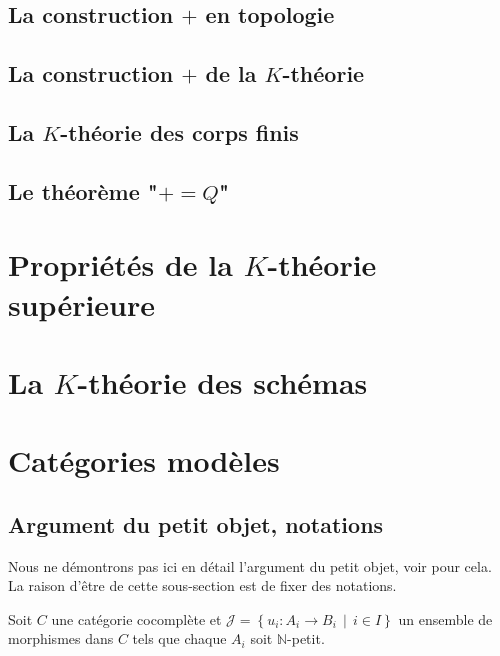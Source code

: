 \documentclass{amsart}
\theoremstyle{plain}
\theoremstyle{definition}
\theoremstyle{remark}
\newcommand{\ensemblenombre }[1]{\mathbb{#1}}
\newcommand{\N}{\ensemblenombre{N}}
\newcommand{\ra}{\rightarrow}
\newcommand{\enstq}[2]{\left\{#1\,\middle|\,#2\right\}}
\begin{document}
\subsection{\texorpdfstring{La construction $+$ en topologie}{La construction + en topologie}}

\subsection{\texorpdfstring{La construction $+$ de la $K$-théorie}{La construction + de la K-théorie}}

\subsection{\texorpdfstring{La $K$-théorie des corps finis}{La K-théorie des corps finis}}

\subsection{\texorpdfstring{Le théorème "$+=Q$"}{Le théorème "+=Q"}}

\section{\texorpdfstring{Propriétés de la $K$-théorie supérieure}{Propriétés de la K-théorie supérieure}}

\section{\texorpdfstring{La $K$-théorie des schémas}{La K-théorie des schémas}}

\appendix

\section{Catégories modèles}

\subsection{Argument du petit objet, notations}

Nous ne démontrons pas ici en détail l'argument du petit objet, voir \cite[Chp.1]{Goer} pour cela.
La raison d'être de cette sous-section est de fixer des notations.

Soit $C$ une catégorie cocomplète et $\mathcal{J}=\enstq{u_i:A_i\ra B_i}{i\in I}$ un ensemble de morphismes dans $C$ tels que
chaque $A_i$ soit $\N$-petit.
\end{document}
